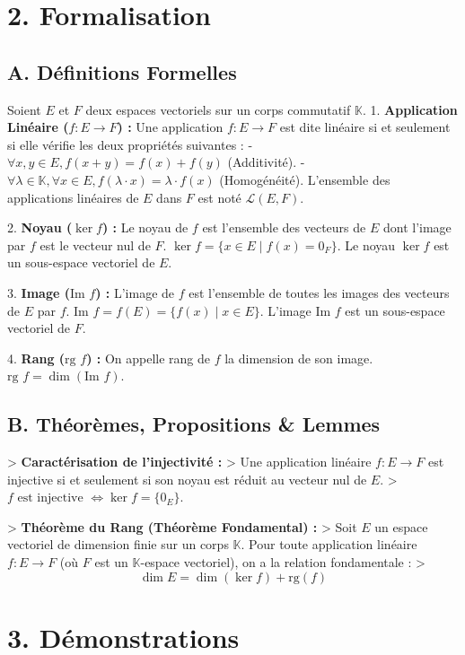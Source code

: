 \documentclass{report}
\begin{document}
\section*{2. Formalisation}

\subsection*{A. Définitions Formelles}
Soient $E$ et $F$ deux espaces vectoriels sur un corps commutatif $\mathbb{K}$.
1.  \textbf{Application Linéaire ($f : E \to F$) :} Une application $f: E \to F$ est dite linéaire si et seulement si elle vérifie les deux propriétés suivantes :
    -   $\forall x, y \in E, f(x + y) = f(x) + f(y)$ (Additivité).
    -   $\forall \lambda \in \mathbb{K}, \forall x \in E, f(\lambda \cdot x) = \lambda \cdot f(x)$ (Homogénéité).
    L'ensemble des applications linéaires de $E$ dans $F$ est noté $\mathcal{L}(E, F)$.

2.  \textbf{Noyau ($\ker f$) :} Le noyau de $f$ est l'ensemble des vecteurs de $E$ dont l'image par $f$ est le vecteur nul de $F$.
    $\ker f = \{ x \in E \mid f(x) = 0_F \}$.
    Le noyau $\ker f$ est un sous-espace vectoriel de $E$.

3.  \textbf{Image ($\text{Im } f$) :} L'image de $f$ est l'ensemble de toutes les images des vecteurs de $E$ par $f$.
    $\text{Im } f = f(E) = \{ f(x) \mid x \in E \}$.
    L'image $\text{Im } f$ est un sous-espace vectoriel de $F$.

4.  \textbf{Rang ($\text{rg } f$) :} On appelle rang de $f$ la dimension de son image.
    $\text{rg } f = \dim(\text{Im } f)$.

\subsection*{B. Théorèmes, Propositions \& Lemmes}
> \textbf{Caractérisation de l'injectivité :}
> Une application linéaire $f: E \to F$ est injective si et seulement si son noyau est réduit au vecteur nul de $E$.
> $f \text{ est injective } \iff \ker f = \{ 0_E \}$.

> \textbf{Théorème du Rang (Théorème Fondamental) :}
> Soit $E$ un espace vectoriel de dimension finie sur un corps $\mathbb{K}$. Pour toute application linéaire $f : E \to F$ (où $F$ est un $\mathbb{K}$-espace vectoriel), on a la relation fondamentale :
> $$\dim E = \dim(\ker f) + \text{rg}(f)$$

\section*{3. Démonstrations}
\end{document}
